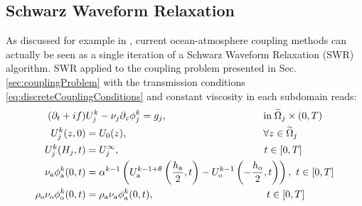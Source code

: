 \subsection{Schwarz Waveform Relaxation}
As discussed for example in \cite{marti_schwarz_2021},
current ocean-atmosphere coupling methods can actually be seen as a 
single iteration of a Schwarz Waveform Relaxation (SWR) algorithm. 
SWR applied to the coupling problem presented 
in Sec. \ref{sec:couplingProblem} with the transmission conditions 
 \eqref{eq:discreteCouplingConditions} and constant viscosity in each subdomain 
 reads:
%
\begin{subequations}
\label{eq:SWRbulk}
\begin{align}
(\partial_t + if) &U^k_j - \nu_j\partial_z \phi^k_j  = g_j, 
\hspace{3.4cm} \mbox{in}\;\widetilde{\Omega}_j \times (0,T) \label{eq:ref} \\
U^k_j(z,0) &= U_0(z),   \hspace{4.8cm}  \forall z \in \widetilde{\Omega}_j  \\
U^k_j(H_j, t) &= U^\infty_j, \hspace{5.1cm}  t \in [0,T]\\
\nu_{\rm a}\phi_{\rm a}^{k}(0,t) &=  \alpha^{k-1} 
\left( U_{\rm a}^{k-1+\theta}\left(\frac{h_{\rm a}}{2},t\right) - U_{\rm o}^{k-1}\left(-\frac{h_{\rm o}}{2},t\right)\right), 
\hspace{0.12cm} t \in [0,T] \label{eq:bulkInterfaceCondition} \\
\rho_{\rm o} \nu_{\rm o}\phi^k_{\rm o}(0,t) &= \rho_{\rm a}
\nu_{\rm a}\phi^k_{\rm a}(0,t), \hspace{3.98cm} t \in [0,T] \label{eq:fluxInterfaceCondition}
\end{align}
\end{subequations}
